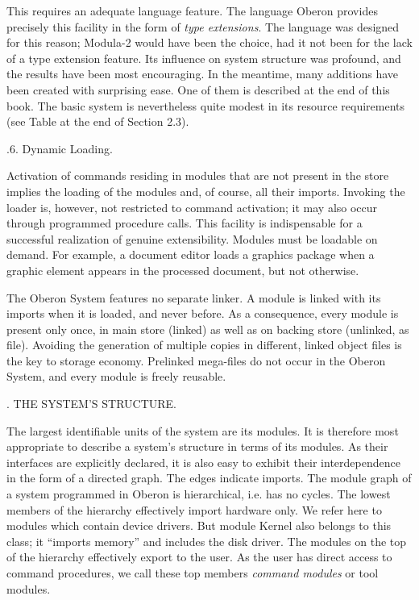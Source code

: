 This requires an adequate language feature. The language Oberon
provides precisely this facility in the form of {\it type extensions\/}. The
language was designed for this reason; Modula-2 would have been the
choice, had it not been for the lack of a type extension feature. Its
influence on system structure was profound, and the results have been
most encouraging. In the meantime, many additions have been created
with surprising ease. One of them is described at the end of this
book. The basic system is nevertheless quite modest in its resource
requirements (see Table at the end of Section 2.3).

.6. Dynamic Loading.

Activation of commands residing in modules that are not present in the
store implies the loading of the modules and, of course, all their
imports. Invoking the loader is, however, not restricted to command
activation; it may also occur through programmed procedure calls. This
facility is indispensable for a successful realization of genuine
extensibility. Modules must be loadable on demand. For example, a
document editor loads a graphics package when a graphic element
appears in the processed document, but not otherwise.

The Oberon System features no separate linker. A module is linked with
its imports when it is loaded, and never before. As a consequence,
every module is present only once, in main store (linked) as well as
on backing store (unlinked, as file). Avoiding the generation of
multiple copies in different, linked object files is the key to
storage economy. Prelinked mega-files do not occur in the Oberon
System, and every module is freely reusable.

. THE SYSTEM'S STRUCTURE.


The largest identifiable units of the system are its modules. It is
therefore most appropriate to describe a system's structure in terms
of its modules. As their interfaces are explicitly declared, it is
also easy to exhibit their interdependence in the form of a directed
graph. The edges indicate imports. The module graph of a system
programmed in Oberon is hierarchical, i.e. has no cycles. The lowest
members of the hierarchy effectively import hardware only. We refer
here to modules which contain device drivers. But module Kernel also
belongs to this class; it ``imports memory'' and includes the disk
driver. The modules on the top of the hierarchy effectively export to
the user. As the user has direct access to command procedures, we call
these top members {\it command modules\/} or tool modules.

